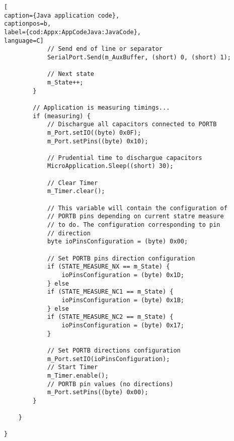 \begin{lstlisting}[
caption={Java application code},
captionpos=b,
label={cod:Appx:AppCodeJava:JavaCode},
language=C]
            // Send end of line or separator
            SerialPort.Send(m_AuxBuffer, (short) 0, (short) 1);

            // Next state
            m_State++;
        }

        // Application is measuring timings...
        if (measuring) {
            // Dischargue all capacitors connected to PORTB
            m_Port.setIO((byte) 0x0F);
            m_Port.setPins((byte) 0x10);

            // Prudential time to dischargue capacitors
            MicroApplication.Sleep((short) 30);

            // Clear Timer
            m_Timer.clear();

            // This variable will contain the configuration of
            // PORTB pins depending on current statre measure
            // to do. The configuration corresponding to pin
            // direction
            byte ioPinsConfiguration = (byte) 0x00;

            // Set PORTB pins direction configuration
            if (STATE_MEASURE_NX == m_State) {
                ioPinsConfiguration = (byte) 0x1D;
            } else
            if (STATE_MEASURE_NC1 == m_State) {
                ioPinsConfiguration = (byte) 0x1B;
            } else
            if (STATE_MEASURE_NC2 == m_State) {
                ioPinsConfiguration = (byte) 0x17;
            }

            // Set PORTB directions configuration
            m_Port.setIO(ioPinsConfiguration);
            // Start Timer
            m_Timer.enable();
            // PORTB pin values (no directions)
            m_Port.setPins((byte) 0x00);
        }
        
    }

}
\end{lstlisting}
\medskip
